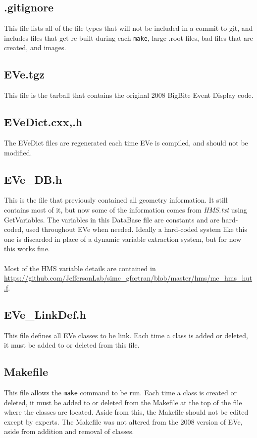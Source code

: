 \documentclass[12pt]{article}
\numberwithin{equation}{section}
\begin{document}
\subsection{.gitignore}
This file lists all of the file types that will not be included in a commit to git, and includes files that get re-built during each \texttt{make}, large .root files, bad files that are created, and images.

\subsection{EVe.tgz}
This file is the tarball that contains the original 2008 BigBite Event Display code.

\subsection{EVeDict.cxx,.h}
The EVeDict files are regenerated each time EVe is compiled, and should not be modified.

\subsection{EVe\_DB.h}
This is the file that previously contained all geometry information. It still contains most of it, but now some of the information comes from \textit{HMS.txt} using GetVariables. The variables in this DataBase file are constants and are hard-coded, used throughout EVe when needed. Ideally a hard-coded system like this one is discarded in place of a dynamic variable extraction system, but for now this works fine.
\\
\\
Most of the HMS variable details are contained in \url{https://github.com/JeffersonLab/simc_gfortran/blob/master/hms/mc_hms_hut.f}.

\subsection{EVe\_LinkDef.h}
This file defines all EVe classes to be link. Each time a class is added or deleted, it must be added to or deleted from this file.

\subsection{Makefile}
This file allows the \texttt{make} command to be run. Each time a class is created or deleted, it must be added to or deleted from the Makefile at the top of the file where the classes are located. Aside from this, the Makefile should not be edited except by experts. The Makefile was not altered from the 2008 version of EVe, aside from addition and removal of classes.
\end{document}
